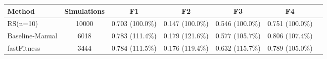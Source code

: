 \begin{tabular}{lcccccc}
\toprule
         Method &  Simulations &              F1 &              F2 &              F3 &              F4 \\
\midrule
       RS(n=10) &        10000 & 0.703 (100.0\%) & 0.147 (100.0\%) & 0.546 (100.0\%) & 0.751 (100.0\%) \\
Baseline-Manual &         6018 & 0.783 (111.4\%) & 0.179 (121.6\%) & 0.577 (105.7\%) & 0.806 (107.4\%) \\
    fastFitness &         3444 & 0.784 (111.5\%) & 0.176 (119.4\%) & 0.632 (115.7\%) & 0.789 (105.0\%) \\
\bottomrule
\end{tabular}
